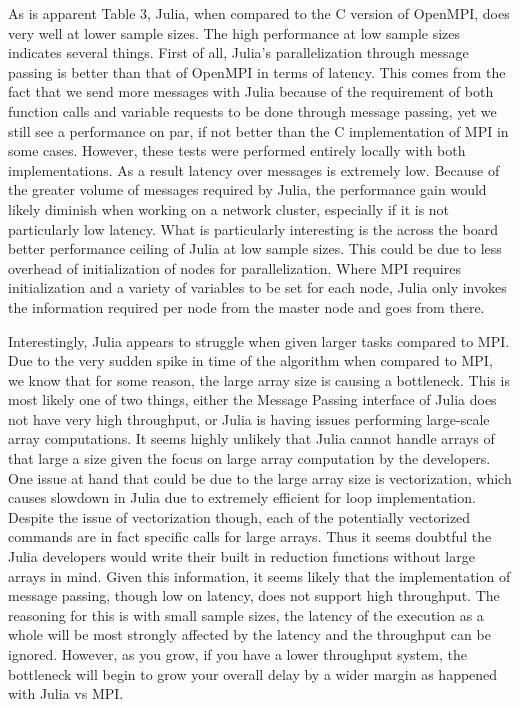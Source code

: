 \documentclass[12pt]{article}
\begin{document}
As is apparent Table 3, Julia, when compared to the C version of OpenMPI, does very well at lower sample sizes. The high performance at low sample sizes indicates several things. First of all, Julia's parallelization through message passing is better than that of OpenMPI in terms of latency. This comes from the fact that we send more messages with Julia because of the requirement of both function calls and variable requests to be done through message passing, yet we still see a performance on par, if not better than the C implementation of MPI in some cases. However, these tests were performed entirely locally with both implementations. As a result latency over messages is extremely low. Because of the greater volume of messages required by Julia, the performance gain would likely diminish when working on a network cluster, especially if it is not particularly low latency. What is particularly interesting is the across the board better performance ceiling of Julia at low sample sizes. This could be due to less overhead of initialization of nodes for parallelization. Where MPI requires initialization and a variety of variables to be set for each node, Julia only invokes the information required per node from the master node and goes from there.

	Interestingly, Julia appears to struggle when given larger tasks compared to MPI. Due to the very sudden spike in time of the algorithm when compared to MPI, we know that for some reason, the large array size is causing a bottleneck. This is most likely one of two things, either the Message Passing interface of Julia does not have very high throughput, or Julia is having issues performing large-scale array computations. It seems highly unlikely that Julia cannot handle arrays of that large a size given the focus on large array computation by the developers. One issue at hand that could be due to the large array size is vectorization, which causes slowdown in Julia due to extremely efficient for loop implementation.\cite{juliafastcomp} Despite the issue of vectorization though, each of the potentially vectorized commands are in fact specific calls for large arrays. Thus it seems doubtful the Julia developers would write their built in reduction functions without large arrays in mind. Given this information, it seems likely that the implementation of message passing, though low on latency, does not support high throughput. The reasoning for this is with small sample sizes, the latency of the execution as a whole will be most strongly affected by the latency and the throughput can be ignored. However, as you grow, if you have a lower throughput system, the bottleneck will begin to grow your overall delay by a wider margin as happened with Julia vs MPI. 
\end{document}
